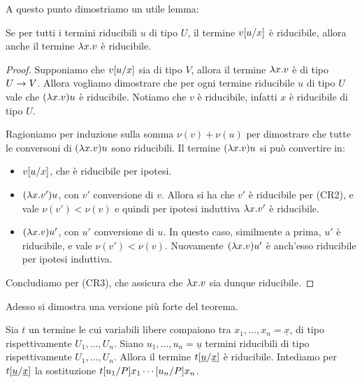 \documentclass[]{marticle}
\begin{document}
A questo punto dimostriamo un utile lemma:
\begin{block}[Lemma]
    Se per tutti i termini riducibili $u$ di tipo $U$, il termine $v[u/x]$
    \`e riducibile, allora anche il termine $\lambda x.v$ \`e riducibile.
\end{block}

\begin{proof}
    Supponiamo che $v[u/x]$ sia di tipo $V$, allora il termine $\lambda x.v$ \`e
    di tipo $U\rightarrow V$. Allora vogliamo dimostrare che per ogni termine
    riducibile $u$ di tipo $U$ vale che $(\lambda x.v)u$ \`e riducibile. Notiamo che
    $v$ \`e riducibile, infatti $x$ \`e riducibile di tipo $U$.

    Ragioniamo per induzione sulla somma $\nu(v)+\nu(u)$ per dimostrare che
    tutte le conversoni di $(\lambda x.v)u$ sono riducibili. Il termine $(\lambda x.v)u$
    si pu\`o convertire in:
    \begin{itemize}
        \item $v[u/x]$, che \`e riducibile per ipotesi.
        \item $(\lambda x. v')u$, con $v'$ conversione di $v$. Allora si ha che $v'$
            \`e riducibile per (CR2), e vale $\nu(v')<\nu(v)$ e quindi per
            ipotesi induttiva $\lambda x. v'$ \`e riducibile.
        \item $(\lambda x. v)u'$, con $u'$ conversione di $u$. In questo caso,
            similmente a prima, $u'$ \`e riducibile, e vale $\nu(v')<\nu(v)$.
            Nuovamente $(\lambda x. v)u'$ \`e anch'esso riducibile per ipotesi
            induttiva.
    \end{itemize}
    Concludiamo per (CR3), che assicura che $\lambda x.v$ sia dunque riducibile.
\end{proof}

Adesso si dimostra una versione pi\`u forte del teorema.

\begin{block}[Proposizione]
    Sia $t$ un termine le cui variabili libere compaiono tra $x_1, \dots, x_n =
    \underline{x}$, di tipo rispettivamente $U_1, \dots, U_n$. Siano $u_1,
    \dots, u_n = \underline{u}$ termini riducibili di tipo rispettivamente $U_1,
    \dots, U_n$. Allora il termine $t[\underline{u}/\underline{x}]$ \`e
    riducibile. Intediamo per $t[\underline{u}/\underline{x}]$ la
    sostituzione $t[u_1/P]{x_1}\cdots[u_n/P]{x_n}$.
\end{block}
\end{document}

